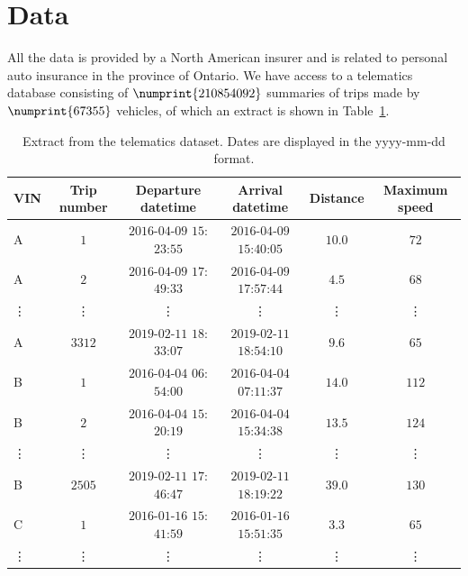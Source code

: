 \documentclass{article}
\begin{document}
\section{Data}\label{sec:data}

All the data is provided by a North American insurer and is related to personal auto insurance in the province of Ontario. We have access to a telematics database consisting of $\numprint{210854092}$ summaries of trips made by $\numprint{67355}$ vehicles, of which an extract is shown in Table~\ref{tab:1}.
\begin{table}[ht]
    \centering
    \begin{adjustbox}{max width = \textwidth}
        \begin{tabular}{l c c c c c}
            \toprule 
            \textbf{VIN} & \textbf{Trip number} & \textbf{Departure datetime} & \textbf{Arrival datetime} & \textbf{Distance} & \textbf{Maximum speed}\\ 
            \midrule
            A & $1$ & $2016$-$04$-$09$ $15$:$23$:$55$ & $2016$-$04$-$09$ $15$:$40$:$05$ & $10.0$ & $72$\\
            A & $2$ & $2016$-$04$-$09$ $17$:$49$:$33$ & $2016$-$04$-$09$ $17$:$57$:$44$ & $4.5$ & $68$\\
            \vdots & \vdots & \vdots & \vdots & \vdots & \vdots \\
            A & $3312$ & $2019$-$02$-$11$ $18$:$33$:$07$ & $2019$-$02$-$11$ $18$:$54$:$10$ & $9.6$ & $65$\\
            \cmidrule(l){1-6}
            B & $1$ & $2016$-$04$-$04$ $06$:$54$:$00$ & $2016$-$04$-$04$ $07$:$11$:$37$ & $14.0$ & $112$\\
            B & $2$ & $2016$-$04$-$04$ $15$:$20$:$19$ & $2016$-$04$-$04$ $15$:$34$:$38$ & $13.5$ & $124$\\
            \vdots & \vdots & \vdots & \vdots & \vdots & \vdots \\
            B & $2505$ & $2019$-$02$-$11$ $17$:$46$:$47$ & $2019$-$02$-$11$ $18$:$19$:$22$ & $39.0$ & $130$\\
            \cmidrule(l){1-6}
            C & $1$ & $2016$-$01$-$16$ $15$:$41$:$59$ & $2016$-$01$-$16$ $15$:$51$:$35$ & $3.3$ & $65$ \\
            \vdots & \vdots & \vdots & \vdots & \vdots & \vdots \\
            \bottomrule 
        \end{tabular}
    \end{adjustbox}
    \caption{Extract from the telematics dataset. Dates are displayed in the yyyy-mm-dd format.} 
    \label{tab:1} 
\end{table}
\end{document}
